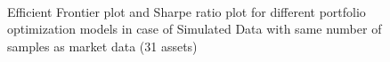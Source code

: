 \begin{figure}[!h]
    
    
     \hfill
   \\
   \caption{Efficient Frontier plot and Sharpe ratio plot for different portfolio optimization models in case of Simulated Data with same number of samples as market data (31 assets)}
   \label{fig:2}
\end{figure}

